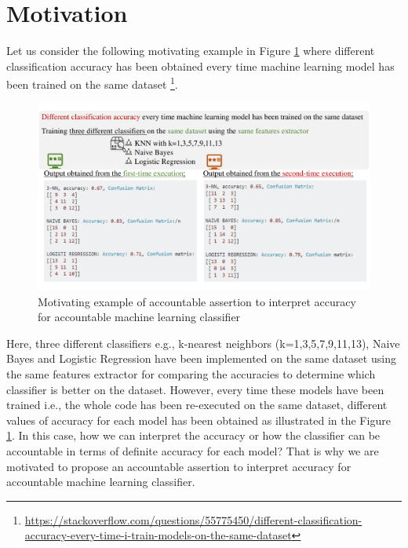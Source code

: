 \section{Motivation}
\label{sec:motivation}

Let us consider the following motivating example in Figure \ref{fig:motiv} where different classification accuracy has been obtained every time machine learning model has been trained on the same dataset  \footnote{\small \url{https://stackoverflow.com/questions/55775450/different-classification-accuracy-every-time-i-train-models-on-the-same-dataset}}. 
\begin{figure}[h]
	\includegraphics[width=\linewidth]{motivfigure.pdf}
	\caption{Motivating example of accountable assertion to interpret accuracy for accountable machine learning classifier}
	\label{fig:motiv}
\end{figure}
Here, three different classifiers e.g., k-nearest neighbors (k=1,3,5,7,9,11,13), Naive Bayes and Logistic Regression have been implemented on the same dataset using the same features extractor for comparing the accuracies to determine which classifier is better on the dataset. However, every time these models have been trained i.e., the whole code has been re-executed on the same dataset, different values of accuracy for each model has been obtained as illustrated in the Figure \ref{fig:motiv}. In this case, how we can interpret the accuracy or how the classifier can be accountable in terms of definite accuracy for each model? That is why we are motivated to propose an accountable assertion to interpret accuracy for accountable machine learning classifier.  



